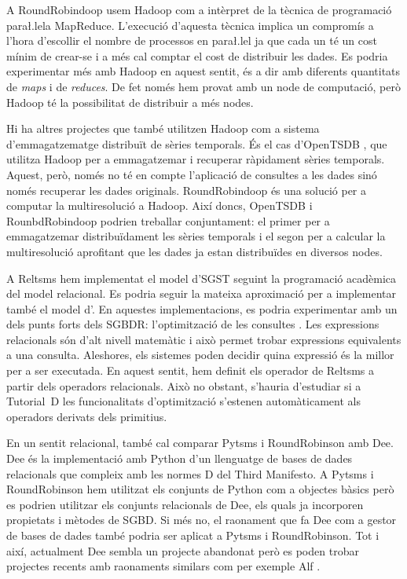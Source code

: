 
A RoundRobindoop usem Hadoop com a intèrpret de la tècnica de
programació para\l.lela MapReduce. L'execució d'aquesta tècnica
implica un compromís a l'hora d'escollir el nombre de processos en
para\l.lel ja que cada un té un cost mínim de crear-se i a més cal
comptar el cost de distribuir les dades. Es podria experimentar més
amb Hadoop en aquest sentit, és a dir amb diferents quantitats de
\emph{maps} i de \emph{reduces}. De fet només hem provat amb un node
de computació, però Hadoop té la possibilitat de distribuir a més
nodes.


Hi ha altres projectes que també utilitzen Hadoop com a sistema
d'emmagatzematge distribuït de sèries temporals. És el cas
d'OpenTSDB \parencite{opentsdb}, que utilitza Hadoop per a
emmagatzemar i recuperar ràpidament sèries temporals.  Aquest, però,
només no té en compte l'aplicació de consultes a les dades sinó només
recuperar les dades originals.  RoundRobindoop és una solució per a
computar la multiresolució a Hadoop. Així doncs, OpenTSDB i
RounbdRobindoop podrien treballar conjuntament: el primer per a
emmagatzemar distribuïdament les sèries temporals i el segon per a
calcular la multiresolució aprofitant que les dades ja estan
distribuïdes en diversos nodes.





A Reltsms hem implementat el model d'\gls{SGST} seguint la programació
acadèmica del model relacional. Es podria seguir la mateixa
aproximació per a implementar també el model d'.  En
aquestes implementacions, es podria experimentar amb un dels punts
forts dels \gls{SGBDR}: l'optimització de les
consultes \parencite[\gls{capitol}~18
\emph{Optimization}]{date04:introduction8}. Les expressions
relacionals són d'alt nivell matemàtic i això permet trobar
expressions equivalents a una consulta. Aleshores, els sistemes poden
decidir quina expressió és la millor per a ser executada.  En aquest
sentit, hem definit els operador de Reltsms a partir dels operadors
relacionals. Això no obstant, s'hauria d'estudiar si a Tutorial~D les
funcionalitats d'optimització s'estenen automàticament als operadors
derivats dels primitius.



En un sentit relacional, també cal comparar Pytsms i RoundRobinson amb
Dee. Dee \parencite{dee} és la implementació amb Python d'un
llenguatge de bases de dades relacionals que compleix amb les normes D
del Third Manifesto. A Pytsms i RoundRobinson hem utilitzat els
conjunts de Python com a objectes bàsics però es podrien utilitzar els
conjunts relacionals de Dee, els quals ja incorporen propietats i
mètodes de \gls{SGBD}. Si més no, el raonament que fa Dee com a gestor
de bases de dades també podria ser aplicat a Pytsms i
RoundRobinson. Tot i així, actualment Dee sembla un projecte abandonat
però es poden trobar projectes recents amb raonaments similars com per exemple
Alf \parencite{alf}.
  



